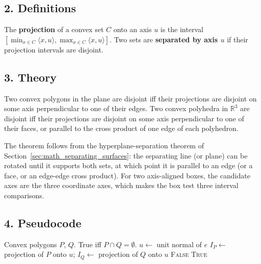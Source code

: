 \subsection{2. Definitions}

\begin{definition}\label{def:convexint_projection}
  The \textbf{projection} of a convex set $C$ onto an axis $u$ is the
  interval $[\min_{x\in C} \langle x, u\rangle, \max_{x\in C} \langle x,
  u\rangle]$. Two sets are \textbf{separated by axis $u$} if their
  projection intervals are disjoint.
\end{definition}

\subsection{3. Theory}

\begin{theorem}\label{thm:convexint_sat}
  Two convex polygons in the plane are disjoint iff their projections are
  disjoint on some axis perpendicular to one of their edges. Two convex
  polyhedra in $\mathbb{R}^3$ are disjoint iff their projections are
  disjoint on some axis perpendicular to one of their faces, or parallel to
  the cross product of one edge of each polyhedron.
\end{theorem}

The theorem follows from the hyperplane-separation theorem of
Section~\ref{sec:math_separating_surfaces}: the separating line (or plane)
can be rotated until it supports both sets, at which point it is parallel
to an edge (or a face, or an edge-edge cross product). For two
axis-aligned boxes, the candidate axes are the three coordinate axes, which
makes the box test three interval comparisons.

\subsection{4. Pseudocode}

\begin{algorithm}[htbp]
\caption{Separating Axis Test for Two Convex Polygons}
\label{alg:convexint_sat}
\begin{algorithmic}[1]
\Require Convex polygons $P$, $Q$.
\Ensure True iff $P \cap Q = \emptyset$.
    \State $u \gets$ unit normal of $e$
    \State $I_P \gets$ projection of $P$ onto $u$; $I_Q \gets$ projection of $Q$ onto $u$
     \State \Return \textsc{False} \EndIf
  \EndFor
  \State \Return \textsc{True}
\EndFunction
\end{algorithmic}
\end{algorithm}

